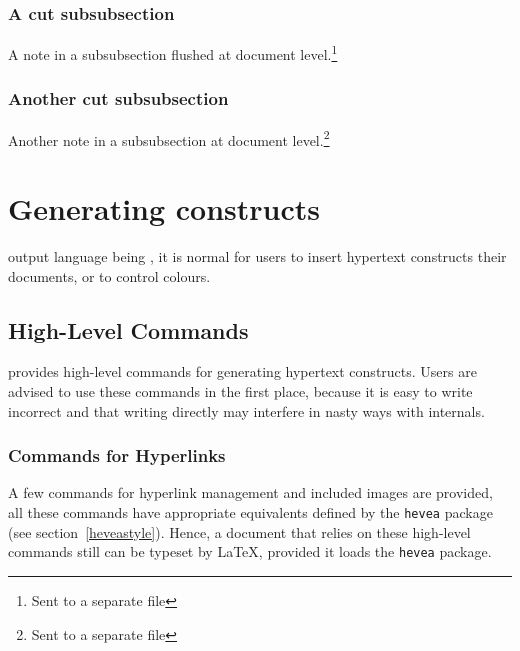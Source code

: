 \subsubsection{A cut subsubsection}
A note in a subsubsection flushed at document level.\footnote{Sent to a
separate file}
\subsubsection{Another cut subsubsection}
Another note in a subsubsection at document level.\footnote{Sent to
a separate file}
%
\cutend
\fi

\section{Generating \html{} constructs}
\hevea{} output language being \html, it is normal for users to insert
hypertext constructs their documents, or to control colours.

\subsection{High-Level Commands}
\hevea{} provides high-level commands for generating
hypertext constructs.
Users are advised to use these commands in the first place,
because it is easy to write incorrect \html{} and that writing
\html{} directly may interfere in nasty ways with \hevea{} internals.


\subsubsection{Commands \label{hyperlink}for Hyperlinks}
A few commands for hyperlink  management and included images
are provided, all these
commands have appropriate equivalents defined by the \texttt{hevea}
package (see section~\ref{heveastyle}).
Hence, a document that relies on these high-level commands
still can be typeset by \LaTeX{}, provided it loads the \texttt{hevea}
package.

